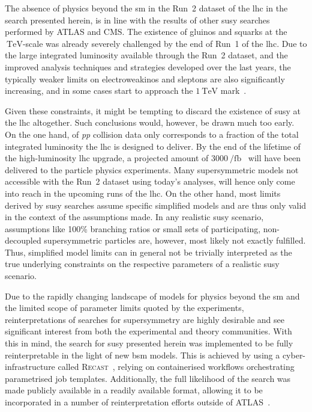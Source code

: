 The absence of physics beyond the \gls{sm} in the Run~2 dataset of the \gls{lhc} in the search presented herein, is in line with the results of other \gls{susy} searches performed by ATLAS and CMS.
The existence of gluinos and squarks at the $\SI{}{\TeV}$-scale was already severely challenged by the end of Run~1 of the \gls{lhc}.
Due to the large integrated luminosity available through the Run~2 dataset, and the improved analysis techniques and strategies developed over the last years, the typically weaker limits on electroweakinos and sleptons are also significantly increasing, and in some cases start to approach the $\SI{1}{\TeV}$ mark~\cite{ATL-PHYS-PUB-2020-020,SUSY-2018-32}. 

Given these constraints, it might be tempting to discard the existence of \gls{susy} at the \gls{lhc} altogether. Such conclusions would, however, be drawn much too early.
On the one hand, \onethirtynineifb of \textit{pp} collision data only corresponds to a fraction of the total integrated luminosity the \gls{lhc} is designed to deliver. By the end of the lifetime of the high-luminosity \gls{lhc} upgrade, a projected amount of $\SI{3000}{\per\femto\barn}$~\cite{Apollinari:2116337} will have been delivered to the particle physics experiments.
Many supersymmetric models not accessible with the Run~2 dataset using today's analyses, will hence only come into reach in the upcoming runs of the \gls{lhc}.
On the other hand, most limits derived by \gls{susy} searches assume specific simplified models and are thus only valid in the context of the assumptions made.
In any realistic \gls{susy} scenario, assumptions like 100\% branching ratios or small sets of participating, non-decoupled supersymmetric particles are, however, most likely not exactly fulfilled.
Thus, simplified model limits can in general not be trivially interpreted as the true underlying constraints on the respective parameters of a realistic \gls{susy} scenario.
 
Due to the rapidly changing landscape of models for physics beyond the \gls{sm} and the limited scope of parameter limits quoted by the experiments, reinterpretations of searches for supersymmetry are highly desirable and see significant interest from both the experimental and theory communities.
With this in mind, the search for \gls{susy} presented herein was implemented to be fully reinterpretable in the light of new \gls{bsm} models.
This is achieved by using a cyber-infrastructure called \textsc{Recast}~\cite{RECAST_cranmer}, relying on containerised workflows orchestrating parametrised job templates.
Additionally, the full likelihood of the search was made publicly available in a readily available format, allowing it to be incorporated in a number of reinterpretation efforts outside of ATLAS~\cite{SModelS_pyhf:2020grj,Goodsell:2020ddr}. 
 

